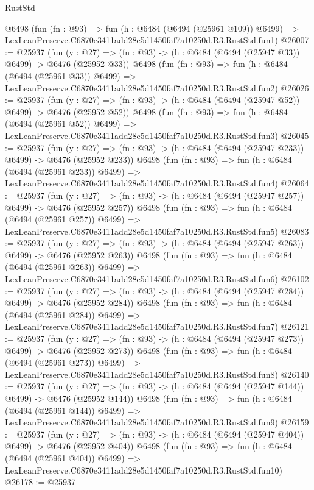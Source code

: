 \begin{lexlean}{RustStd}
\begin{coremodule}
    @6498
    (fun (fn : @93) =>
    fun (h : @6484 (@6494 (@25961 @109)) @6499) =>
    LexLeanPreserve.C6870e3411add28e5d1450faf7a10250d.R3.RustStd.fun1)
@26007 := @25937
    (fun (y : @27) => (fn : @93) -> (h : @6484 (@6494 (@25947 @33)) @6499) -> @6476 (@25952 @33))
    @6498
    (fun (fn : @93) =>
    fun (h : @6484 (@6494 (@25961 @33)) @6499) =>
    LexLeanPreserve.C6870e3411add28e5d1450faf7a10250d.R3.RustStd.fun2)
@26026 := @25937
    (fun (y : @27) => (fn : @93) -> (h : @6484 (@6494 (@25947 @52)) @6499) -> @6476 (@25952 @52))
    @6498
    (fun (fn : @93) =>
    fun (h : @6484 (@6494 (@25961 @52)) @6499) =>
    LexLeanPreserve.C6870e3411add28e5d1450faf7a10250d.R3.RustStd.fun3)
@26045 := @25937
    (fun (y : @27) => (fn : @93) -> (h : @6484 (@6494 (@25947 @233)) @6499) -> @6476 (@25952 @233))
    @6498
    (fun (fn : @93) =>
    fun (h : @6484 (@6494 (@25961 @233)) @6499) =>
    LexLeanPreserve.C6870e3411add28e5d1450faf7a10250d.R3.RustStd.fun4)
@26064 := @25937
    (fun (y : @27) => (fn : @93) -> (h : @6484 (@6494 (@25947 @257)) @6499) -> @6476 (@25952 @257))
    @6498
    (fun (fn : @93) =>
    fun (h : @6484 (@6494 (@25961 @257)) @6499) =>
    LexLeanPreserve.C6870e3411add28e5d1450faf7a10250d.R3.RustStd.fun5)
@26083 := @25937
    (fun (y : @27) => (fn : @93) -> (h : @6484 (@6494 (@25947 @263)) @6499) -> @6476 (@25952 @263))
    @6498
    (fun (fn : @93) =>
    fun (h : @6484 (@6494 (@25961 @263)) @6499) =>
    LexLeanPreserve.C6870e3411add28e5d1450faf7a10250d.R3.RustStd.fun6)
@26102 := @25937
    (fun (y : @27) => (fn : @93) -> (h : @6484 (@6494 (@25947 @284)) @6499) -> @6476 (@25952 @284))
    @6498
    (fun (fn : @93) =>
    fun (h : @6484 (@6494 (@25961 @284)) @6499) =>
    LexLeanPreserve.C6870e3411add28e5d1450faf7a10250d.R3.RustStd.fun7)
@26121 := @25937
    (fun (y : @27) => (fn : @93) -> (h : @6484 (@6494 (@25947 @273)) @6499) -> @6476 (@25952 @273))
    @6498
    (fun (fn : @93) =>
    fun (h : @6484 (@6494 (@25961 @273)) @6499) =>
    LexLeanPreserve.C6870e3411add28e5d1450faf7a10250d.R3.RustStd.fun8)
@26140 := @25937
    (fun (y : @27) => (fn : @93) -> (h : @6484 (@6494 (@25947 @144)) @6499) -> @6476 (@25952 @144))
    @6498
    (fun (fn : @93) =>
    fun (h : @6484 (@6494 (@25961 @144)) @6499) =>
    LexLeanPreserve.C6870e3411add28e5d1450faf7a10250d.R3.RustStd.fun9)
@26159 := @25937
    (fun (y : @27) => (fn : @93) -> (h : @6484 (@6494 (@25947 @404)) @6499) -> @6476 (@25952 @404))
    @6498
    (fun (fn : @93) =>
    fun (h : @6484 (@6494 (@25961 @404)) @6499) =>
    LexLeanPreserve.C6870e3411add28e5d1450faf7a10250d.R3.RustStd.fun10)
@26178 := @25937

\end{coremodule}
\end{lexlean}
